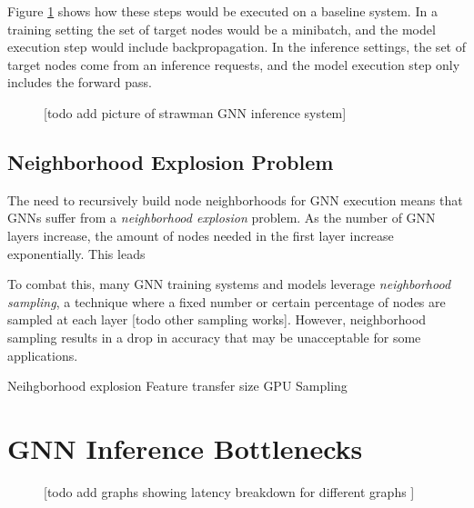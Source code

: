 Figure \ref{Basic System Diagram} shows how these steps would be executed on a baseline system. In a training setting the set of target nodes would be a minibatch, and the model execution step would include backpropagation. In the inference settings, the set of target nodes come from an inference requests, and the model execution step only includes the forward pass.

\begin{figure}[h!]
    \centering
    
    \caption{[todo add picture of strawman GNN inference system]}
    \label{Basic System Diagram}
\end{figure}    

\subsection{Neighborhood Explosion Problem}
The need to recursively build node neighborhoods for GNN execution means that GNNs suffer from a \textit{neighborhood explosion} problem. As the number of GNN layers increase, the amount of nodes needed in the first layer increase exponentially. This leads 

To combat this, many GNN training systems and models leverage \textit{neighborhood sampling}, a technique where a fixed number or certain percentage of nodes are sampled at each layer \cite{GraphSAGE_2017} [todo other sampling works]. However, neighborhood sampling results in a drop in accuracy that may be unacceptable for some applications.



Neihgborhood explosion
Feature transfer size
GPU Sampling

\section{GNN Inference Bottlenecks}

\begin{figure}[h!]
    \centering
    
    \caption{[todo add graphs showing latency breakdown for different graphs ]}
    \label{Baseline Latency Breakdown}
\end{figure}    

